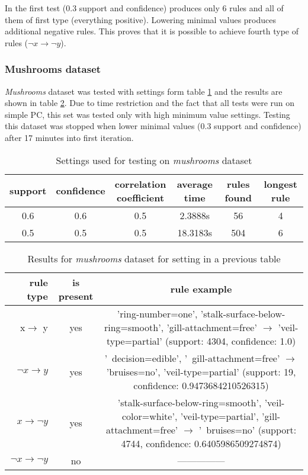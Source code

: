 \documentclass{article}
\begin{document}
 	In the first test (0.3 support and confidence) produces only 6 rules and all of them of first type (everything positive). Lowering minimal values produces additional negative rules. This proves that it is possible to achieve fourth type of rules ($\neg x\rightarrow \neg y$).
	 
	\subsubsection{Mushrooms dataset}
	\textit{Mushrooms} dataset was tested with settings form table \ref{ms} and the results are shown in table \ref{mr}. Due to time restriction and the fact that all tests were run on simple PC, this set was tested only with high minimum value settings. Testing this dataset was stopped when lower minimal values (0.3 support and confidence) after 17 minutes into first iteration.
	
	\begin{table}[H]
		\centering
		\caption{Settings used for testing on \textit{mushrooms} dataset}
		\label{ms}
		\begin{tabular}{c |c |c|c|c|c}
			support&confidence&\makecell{correlation\\coefficient}&average time&rules found&longest rule\\
			\hline
			\hline
			0.6&0.6&0.5&2.3888s&56&4\\
			\hline
			0.5&0.5&0.5&18.3183s&504&6\\
		\end{tabular}
	\end{table}
	\begin{table}[H]
		\centering
		\caption{Results for \textit{mushrooms} dataset for setting in a previous table}
		\label{mr}
		\begin{tabular}{r|c |c}
			rule type& is present & rule example\\
			\hline
			\hline
			x$\rightarrow$ y & yes &\makecell{'ring-number=one', 'stalk-surface-below-ring=smooth',\\ 'gill-attachment=free' $\rightarrow$\\ 'veil-type=partial'\\ (support: 4304, confidence: 1.0)} \\
			\hline
			$\neg x\rightarrow y$ & yes &\makecell{'~decision=edible', '~gill-attachment=free' $\rightarrow$\\ 'bruises=no', 'veil-type=partial'\\ (support: 19, confidence: 0.9473684210526315)}\\
			\hline
			$x\rightarrow \neg y $& yes &\makecell{'stalk-surface-below-ring=smooth', 'veil-color=white',\\ 'veil-type=partial', 'gill-attachment=free' $\rightarrow$\\ '~bruises=no'\\ (support: 4744, confidence: 0.6405986509274874)}\\
			\hline
			$\neg x\rightarrow \neg y $& no &--------------- \\ 
		\end{tabular}
	\end{table}
	
\end{document}
